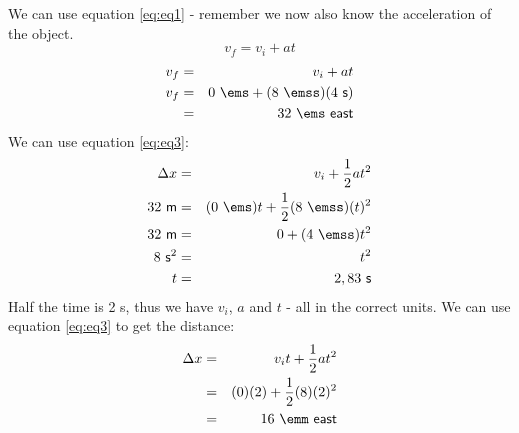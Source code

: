 \begin{wex}
{ We can use equation \ref{eq:eq1} - remember we now also know the acceleration of the object.
\begin{displaymath}
v_f = v_i + at
\end{displaymath}
\begin{eqnarray*}
v_f &=& v_i + at\\
v_f &=& 0\ \ems +(8\ \emss)(4\ \mathsf{s})\\
&=&32\ \ems~\mathsf{east}
\end{eqnarray*}
We can use equation \ref{eq:eq3}:
\begin{eqnarray*}
\Delta x &=& v_i + \frac{1}{2}at^2\\
32\ \mathsf{m} &=& (0\ \ems)t + \frac{1}{2}(8\ \emss)(t)^2\\
32\ \mathsf{m} &=& 0 + (4\ \emss)t^2\\
8\ \mathsf{s}^2 &=& t^2\\
t &=& 2,83~\mathsf{s}
\end{eqnarray*}
Half the time is 2 s, thus we have $v_i$, $a$ and $t$ - all in the correct units. We can use equation \ref{eq:eq3} to get the distance:
\begin{eqnarray*}
\Delta x&=&v_it+\frac{1}{2}at^2\\
&=&(0)(2)+\frac{1}{2}(8)(2)^2\\
&=&16\ \emm~\mathsf{east}
\end{eqnarray*}
}
\end{wex}
    \noindent
\label{m38796*secfhsst!!!underscore!!!id5845}
